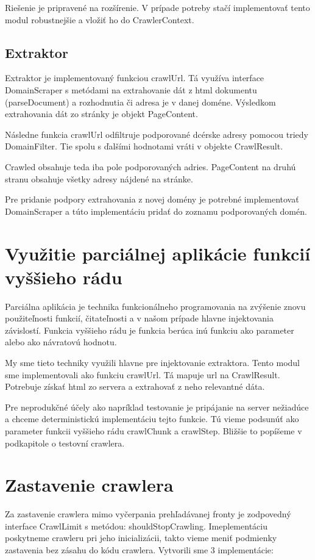 Riešenie je pripravené na rozšírenie. V prípade potreby stačí implementovať tento modul robustnejšie a vložiť ho do CrawlerContext. 

\subsection{Extraktor}
Extraktor je implementovaný funkciou crawlUrl. Tá využíva interface DomainScraper s metódami na extrahovanie dát z html  dokumentu (parseDocument) a rozhodnutia či adresa je v danej doméne. Výsledkom extrahovania dát zo stránky je objekt PageContent. 

Následne funkcia crawlUrl odfiltruje podporované dcérske adresy pomocou triedy DomainFilter. Tie spolu s ďalšími hodnotami vráti v objekte CrawlResult. 

Crawled obsahuje teda iba pole podporovaných adries. PageContent na druhú stranu obsahuje všetky adresy nájdené na stránke. 

Pre pridanie podpory extrahovania z novej domény je potrebné implementovať DomainScraper a túto implementáciu pridať do zoznamu podporovaných domén. 


\section{Využitie parciálnej aplikácie funkcií vyššieho rádu}
Parciálna aplikácia je technika funkcionálneho programovania na zvýšenie znovu použiteľnosti funkcií, čitateľnosti a v našom prípade hlavne injektovania závislostí. Funkcia vyššieho rádu je funkcia berúca inú funkciu ako parameter alebo ako návratovú hodnotu. 

My sme tieto techniky využili hlavne pre injektovanie extraktora. Tento modul sme implementovali ako funkciu crawlUrl. Tá mapuje url na CrawlResult. Potrebuje získať html zo servera a extrahovať z neho relevantné dáta. 

Pre neprodukčné účely ako napríklad testovanie je pripájanie na server nežiadúce a chceme deterministickú implementáciu tejto funkcie. Tú vieme podsunúť ako parameter funkcii vyššieho rádu crawlChunk a crawlStep. Bližšie to popíšeme v podkapitole o testovní crawlera. 

\section{Zastavenie crawlera} \label{c:stopCrawling}
Za zastavenie crawlera mimo vyčerpania prehľadávanej fronty je zodpovedný interface CrawlLimit s metódou: shouldStopCrawling. Imeplementáciu poskytneme crawleru pri jeho inicializácii, takto vieme meniť podmienky zastavenia bez zásahu do kódu crawlera. Vytvorili sme 3 implementácie: 

